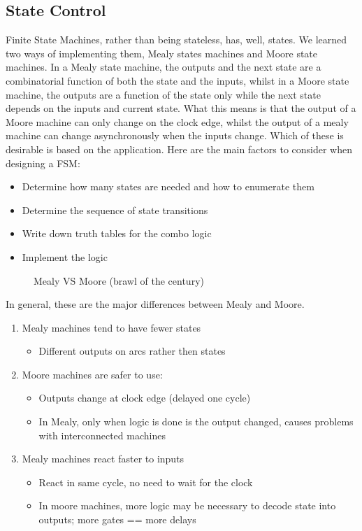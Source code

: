 \subsection{State Control}
Finite State Machines, rather than being stateless, has, well, states. We learned two ways of implementing them, Mealy states machines and Moore state machines. In a Mealy state machine, the outputs and the next state are a combinatorial function of both the state and the inputs, whilst in a Moore state machine, the outputs are a function of the state only while the next state depends on the inputs and current state. \newline What this means is that the output of a Moore machine can only change on the clock edge, whilst the output of a mealy machine can change asynchronously when the inputs change. Which of these is desirable is based on the application. Here are the main factors to consider when designing a FSM:
\begin{itemize}
	\item Determine how many states are needed and how to enumerate them
	\item Determine the sequence of state transitions
	\item Write down truth tables for the combo logic
	\item Implement the logic
\end{itemize}
\begin{figure}[!htb]
	\caption{\label{fig:states} Mealy VS Moore (brawl of the century)}
\end{figure}
In general, these are the major differences between Mealy and Moore.
\begin{enumerate}
	\item Mealy machines tend to have fewer states
	\begin{itemize}
		\item Different outputs on arcs rather then states
	\end{itemize}
	\item Moore machines are safer to use:
	\begin{itemize}
		\item Outputs change at clock edge (delayed one cycle)
		\item In Mealy, only when logic is done is the output changed, causes problems with interconnected machines
	\end{itemize}
	\item Mealy machines react faster to inputs
	\begin{itemize}
		\item React in same cycle, no need to wait for the clock
		\item In moore machines, more logic may be necessary to decode state into outputs; more gates == more delays
	\end{itemize}
\end{enumerate}
